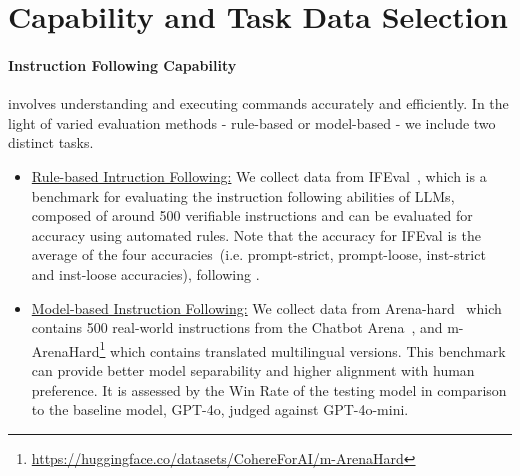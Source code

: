 \clearpage
\appendix


\section{Capability and Task Data Selection}
\label{sec:appendix-task}


\paragraph{Instruction Following Capability} involves understanding and executing commands accurately and efficiently. In the light of varied evaluation methods - rule-based or model-based - we include two distinct tasks.


\begin{itemize}[nosep,itemsep=1pt,leftmargin=0.1cm]
    \item \underline{Rule-based Intruction Following:} We collect data from IFEval~\cite{zhou2023instruction}, which is a benchmark for evaluating the instruction following abilities of LLMs, composed of around 500 verifiable instructions and can be evaluated for accuracy using automated rules.
    Note that the accuracy for IFEval is the average of the four accuracies~(i.e. prompt-strict, prompt-loose, inst-strict and inst-loose accuracies), following \cite{dubey2024llama}.
    \item \underline{Model-based Instruction Following:} We collect data from Arena-hard~\cite{li2024crowdsourced} which contains 500 real-world instructions from the Chatbot Arena~\cite{chiang2024chatbot}, and m-ArenaHard\footnote{\url{https://huggingface.co/datasets/CohereForAI/m-ArenaHard}} which contains translated multilingual versions. This benchmark can provide better model separability and higher alignment with human preference. It is assessed by the Win Rate of the testing model in comparison to the baseline model, GPT-4o, judged against GPT-4o-mini.
\end{itemize}


